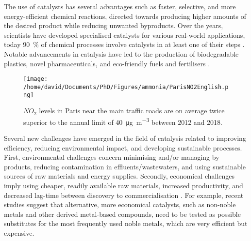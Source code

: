 The use of catalysts has several advantages such as faster, selective, and more energy-efficient chemical reactions, directed towards producing higher amounts of the desired product while reducing unwanted byproducts.
Over the years, scientists have developed specialised catalysts for various real-world applications, today \qty{90}{\percent} of chemical processes involve catalysts in at least one of their steps \parencite{WEINER1998915, DeVries2012}.
Notable advancements in catalysis have led to the production of biodegradable plastics, novel pharmaceuticals, and eco-friendly fuels and fertilisers \parencite{FECHETE20122}.

\begin{figure}[!htb]
    \centering
    \texttt{[image: /home/david/Documents/PhD/Figures/ammonia/ParisNO2English.png]}
    \caption{
        $NO_2$ levels in Paris near the main traffic roads are on average twice superior to the annual limit of \qty{40}{\ug \per \m^3} \parencite{AirParis} between 2012 and 2018.
    }
    \label{fig:NO2Paris}
\end{figure}

Several new challenges have emerged in the field of catalysis related to improving efficiency, reducing environmental impact, and developing sustainable processes.
First, environmental challenges concern minimising and/or managing by-products, reducing contamination in effluents/wastewaters, and using sustainable sources of raw materials \parencite{LUDWIG2017, Lange2021} and energy supplies.
Secondly, economical challenges imply using cheaper, readily available raw materials, increased productivity, and decreased lag-time between discovery to commercialisation \parencite{Keisuke2019, Gunay2021}.
For example, recent studies suggest that alternative, more economical catalysts, such as non-noble metals \parencite{Zhong2021} and other derived metal-based compounds, need to be tested as possible substitutes for the most frequently used noble metals, which are very efficient but expensive.

